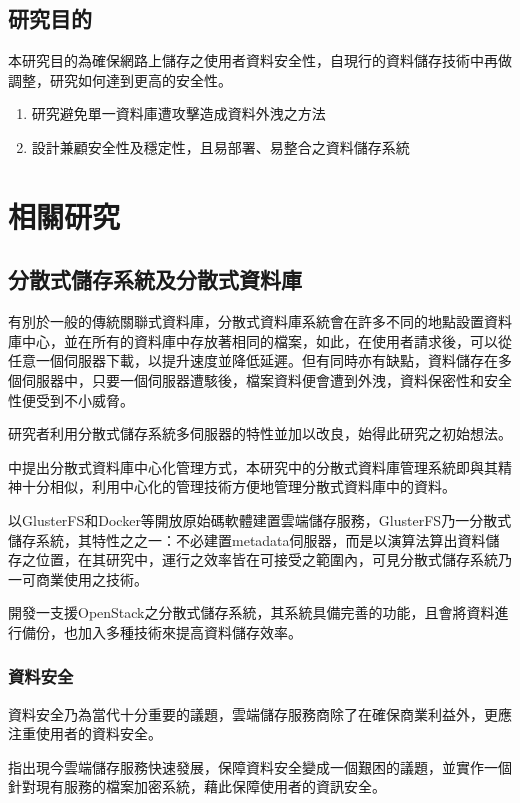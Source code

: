 \documentclass[11pt,twocolumn]{article}
\begin{document}
\subsection{研究目的}
本研究目的為確保網路上儲存之使用者資料安全性，自現行的資料儲存技術中再做調整，研究如何達到更高的安全性。\par
\begin{enumerate}
  \item 研究避免單一資料庫遭攻擊造成資料外洩之方法
  \item 設計兼顧安全性及穩定性，且易部署、易整合之資料儲存系統
\end{enumerate}


 
 
\section{相關研究}
\subsection{分散式儲存系統及分散式資料庫}
有別於一般的傳統關聯式資料庫，分散式資料庫系統會在許多不同的地點設置資料庫中心，並在所有的資料庫中存放著相同的檔案，如此，在使用者請求後，可以從任意一個伺服器下載，以提升速度並降低延遲。但有同時亦有缺點，資料儲存在多個伺服器中，只要一個伺服器遭駭後，檔案資料便會遭到外洩，資料保密性和安全性便受到不小威脅。\par
研究者利用分散式儲存系統多伺服器的特性並加以改良，始得此研究之初始想法。\par

\cite{centralDDBMS}中提出分散式資料庫中心化管理方式，本研究中的分散式資料庫管理系統即與其精神十分相似，利用中心化的管理技術方便地管理分散式資料庫中的資料。\par
\cite{distributed_filesystem}以GlusterFS和Docker等開放原始碼軟體建置雲端儲存服務，GlusterFS乃一分散式儲存系統，其特性之之一：不必建置metadata伺服器，而是以演算法算出資料儲存之位置，在其研究中，運行之效率皆在可接受之範圍內，可見分散式儲存系統乃一可商業使用之技術。\par
\cite{DISCO}開發一支援OpenStack之分散式儲存系統，其系統具備完善的功能，且會將資料進行備份，也加入多種技術來提高資料儲存效率。\par

\subsubsection{資料安全}
資料安全乃為當代十分重要的議題，雲端儲存服務商除了在確保商業利益外，更應注重使用者的資料安全。\par
\cite{clouddatasafe}指出現今雲端儲存服務快速發展，保障資料安全變成一個艱困的議題，並實作一個針對現有服務的檔案加密系統，藉此保障使用者的資訊安全。
\end{document}

